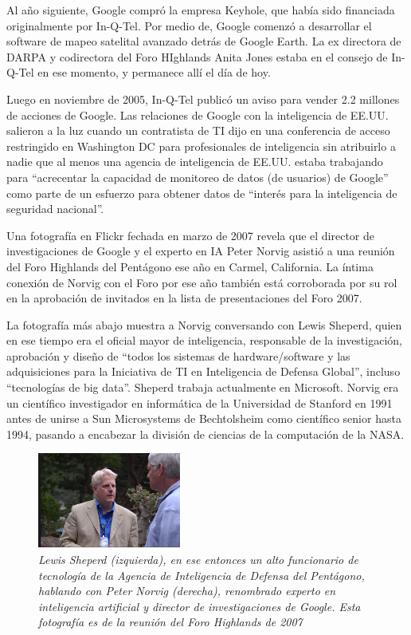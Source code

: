 \documentclass[10pt,a5paper,twoside,spanish,]{book}
\begin{document}
Al año siguiente, Google compró la empresa Keyhole, que había sido
financiada originalmente por In-Q-Tel. Por medio de, Google comenzó a
desarrollar el software de mapeo satelital avanzado detrás de Google
Earth. La ex directora de DARPA y codirectora del Foro HIghlands Anita
Jones estaba en el consejo de In-Q-Tel en ese momento, y permanece allí
el día de hoy.

Luego en noviembre de 2005, In-Q-Tel publicó un aviso para vender 2.2
millones de acciones de Google. Las relaciones de Google con la
inteligencia de EE.UU. salieron a la luz cuando un contratista de TI
dijo en una conferencia de acceso restringido en Washington DC para
profesionales de inteligencia sin atribuirlo a nadie que al menos una
agencia de inteligencia de EE.UU. estaba trabajando para ``acrecentar la
capacidad de monitoreo de datos (de usuarios) de Google'' como parte de
un esfuerzo para obtener datos de ``interés para la inteligencia de
seguridad nacional''.

Una fotografía en Flickr fechada en marzo de 2007 revela que el director
de investigaciones de Google y el experto en IA Peter Norvig asistió a
una reunión del Foro Highlands del Pentágono ese año en Carmel,
California. La íntima conexión de Norvig con el Foro por ese año también
está corroborada por su rol en la aprobación de invitados en la lista de
presentaciones del Foro 2007.

La fotografía más abajo muestra a Norvig conversando con Lewis Sheperd,
quien en ese tiempo era el oficial mayor de inteligencia, responsable de
la investigación, aprobación y diseño de ``todos los sistemas de
hardware/software y las adquisiciones para la Iniciativa de TI en
Inteligencia de Defensa Global'', incluso ``tecnologías de big data''.
Sheperd trabaja actualmente en Microsoft. Norvig era un científico
investigador en informática de la Universidad de Stanford en 1991 antes
de unirse a Sun Microsystems de Bechtolsheim como científico senior
hasta 1994, pasando a encabezar la división de ciencias de la
computación de la NASA.

\begin{figure}[htbp]
\centering
\includegraphics{1.7.png}
\caption{\emph{Lewis Sheperd (izquierda), en ese entonces un alto
funcionario de tecnología de la Agencia de Inteligencia de Defensa del
Pentágono, hablando con Peter Norvig (derecha), renombrado experto en
inteligencia artificial y director de investigaciones de Google. Esta
fotografía es de la reunión del Foro Highlands de 2007}}
\end{figure}
\end{document}
